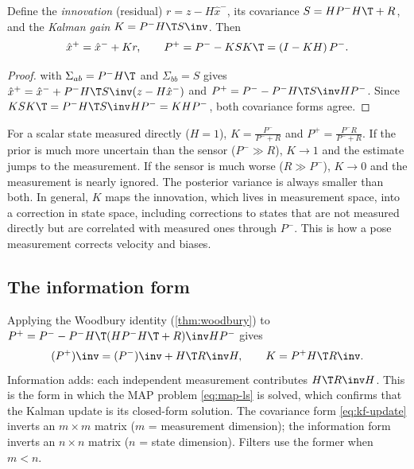 \begin{theorem}
\label{thm:kf-update}
Define the \emph{innovation} (residual) $r = z - H\hat x^-$, its covariance $S = HP^-H\T + R$, and the
\emph{Kalman gain} $K = P^-H\T S\inv$. Then
\begin{equation}
  \hat x^+ = \hat x^- + K r, \qquad P^+ = P^- - K S K\T = (I - KH)\,P^- .
  \label{eq:kf-update}
\end{equation}
\end{theorem}
\begin{proof}
 with $\Sigma_{ab} = P^-H\T$ and $\Sigma_{bb} = S$ gives
$\hat x^+ = \hat x^- + P^-H\T S\inv(z - H\hat x^-)$ and $P^+ = P^- - P^-H\T S\inv HP^-$. Since
$KSK\T = P^-H\T S\inv HP^- = KHP^-$, both covariance forms agree.
\end{proof}

\begin{keyidea}
For a scalar state measured directly ($H = 1$), $K = \frac{P^-}{P^- + R}$ and
$P^+ = \frac{P^- R}{P^- + R}$. If the prior is much more uncertain than the sensor ($P^- \gg R$), $K \to 1$
and the estimate jumps to the measurement. If the sensor is much worse ($R \gg P^-$), $K \to 0$ and the
measurement is nearly ignored. The posterior variance is always smaller than both. In general, $K$
maps the innovation, which lives in measurement space, into a correction in state space, including
corrections to states that are not measured directly but are correlated with measured ones through
$P^-$. This is how a pose measurement corrects velocity and biases.
\end{keyidea}

\subsection{The information form}

Applying the Woodbury identity (\cref{thm:woodbury}) to $P^+ = P^- - P^-H\T(HP^-H\T + R)\inv HP^-$ gives
\begin{equation}
  (P^+)\inv = (P^-)\inv + H\T R\inv H, \qquad K = P^+ H\T R\inv .
  \label{eq:kf-info}
\end{equation}
Information adds: each independent measurement contributes $H\T R\inv H$. This is the form in which the
MAP problem \eqref{eq:map-ls} is solved, which confirms that the Kalman update is its closed-form
solution. The covariance form \eqref{eq:kf-update} inverts an $m\times m$ matrix ($m$ = measurement
dimension); the information form inverts an $n\times n$ matrix ($n$ = state dimension). Filters use the
former when $m < n$.

